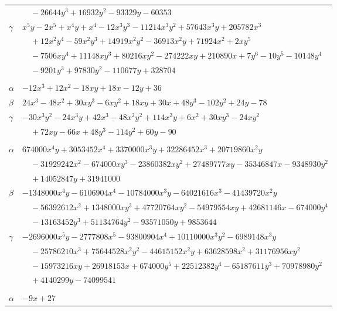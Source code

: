 \documentclass[11pt]{article}
\begin{document}
\begin{longtable}{@{}ll@{}}
 & $\quad -26644y^{3}+16932y^{2}-93329y-60353$\\
$\gamma$ & $x^{5}y-2x^{5}+x^{4}y+x^{4}-12x^{3}y^{3}-11214x^{3}y^{2}+57643x^{3}y+205782x^{3}$\\
 & $\quad +12x^{2}y^{4}-59x^{2}y^{3}+14919x^{2}y^{2}-36913x^{2}y+71924x^{2}+2xy^{5}$\\
 & $\quad -7506xy^{4}+11148xy^{3}+80216xy^{2}-274222xy+210890x+7y^{6}-10y^{5}-10148y^{4}$\\
 & $\quad -9201y^{3}+97830y^{2}-110677y+328704$\\
\addlinespace[3pt]
\multicolumn{2}{@{}l}{$\{i,j\}=\{120,162\}$, $k_{ij}=2^{2}\cdot 3^{3}$}\\
$\alpha$ & $-12x^{3}+12x^{2}-18xy+18x-12y+36$\\
$\beta$ & $24x^{3}-48x^{2}+30xy^{3}-6xy^{2}+18xy+30x+48y^{3}-102y^{2}+24y-78$\\
$\gamma$ & $-30x^{3}y^{2}-24x^{3}y+42x^{3}-48x^{2}y^{2}+114x^{2}y+6x^{2}+30xy^{3}-24xy^{2}$\\
 & $\quad +72xy-66x+48y^{3}-114y^{2}+60y-90$\\
\addlinespace[3pt]
\multicolumn{2}{@{}l}{$\{i,j\}=\{120,163\}$, $k_{ij}=2^{3}\cdot 3^{4}\cdot 5^{3}\cdot 7\cdot 13^{2}$}\\
$\alpha$ & $674000x^{4}y+3053452x^{4}+3370000x^{3}y+32286452x^{3}+20719860x^{2}y$\\
 & $\quad -31929242x^{2}-674000xy^{3}-23860382xy^{2}+27489777xy-35346847x-9348930y^{2}$\\
 & $\quad +14052847y+31941000$\\
$\beta$ & $-1348000x^{4}y-6106904x^{4}-10784000x^{3}y-64021616x^{3}-41439720x^{2}y$\\
 & $\quad -56392612x^{2}+1348000xy^{3}+47720764xy^{2}-54979554xy+42681146x-674000y^{4}$\\
 & $\quad -13163452y^{3}+51134764y^{2}-93571050y+9853644$\\
$\gamma$ & $-2696000x^{5}y-2777808x^{5}-93800904x^{4}+10110000x^{3}y^{2}-6989148x^{3}y$\\
 & $\quad -25786210x^{3}+75644528x^{2}y^{2}-44615152x^{2}y+63628598x^{2}+31176956xy^{2}$\\
 & $\quad -15973216xy+26918153x+674000y^{5}+22512382y^{4}-65187611y^{3}+70978980y^{2}$\\
 & $\quad +4140299y-74099541$\\
\addlinespace[3pt]
\multicolumn{2}{@{}l}{$\{i,j\}=\{120,210\}$, $k_{ij}=3^{4}$}\\
$\alpha$ & $-9x+27$\\

\end{longtable}
\end{document}

